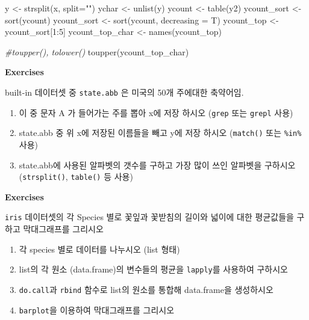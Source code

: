 \documentclass[
]{book}
\newenvironment{Shaded}{\begin{snugshade}}{\end{snugshade}}
\newcommand{\AttributeTok}[1]{\textcolor[rgb]{0.77,0.63,0.00}{#1}}
\newcommand{\CommentTok}[1]{\textcolor[rgb]{0.56,0.35,0.01}{\textit{#1}}}
\newcommand{\DecValTok}[1]{\textcolor[rgb]{0.00,0.00,0.81}{#1}}
\newcommand{\FunctionTok}[1]{\textcolor[rgb]{0.00,0.00,0.00}{#1}}
\newcommand{\NormalTok}[1]{#1}
\newcommand{\OtherTok}[1]{\textcolor[rgb]{0.56,0.35,0.01}{#1}}
\newcommand{\SpecialCharTok}[1]{\textcolor[rgb]{0.00,0.00,0.00}{#1}}
\newcommand{\StringTok}[1]{\textcolor[rgb]{0.31,0.60,0.02}{#1}}
\providecommand{\tightlist}{%
  \setlength{\itemsep}{0pt}\setlength{\parskip}{0pt}}
\begin{document}
\begin{Shaded}
\begin{Highlighting}[]
\NormalTok{y }\OtherTok{\textless{}{-}} \FunctionTok{strsplit}\NormalTok{(x, }\AttributeTok{split=}\StringTok{""}\NormalTok{)}
\NormalTok{ychar }\OtherTok{\textless{}{-}} \FunctionTok{unlist}\NormalTok{(y)}
\NormalTok{ycount }\OtherTok{\textless{}{-}} \FunctionTok{table}\NormalTok{(y2)}
\NormalTok{ycount\_sort }\OtherTok{\textless{}{-}} \FunctionTok{sort}\NormalTok{(ycount)}
\NormalTok{ycount\_sort }\OtherTok{\textless{}{-}} \FunctionTok{sort}\NormalTok{(ycount, }\AttributeTok{decreasing =}\NormalTok{ T)}
\NormalTok{ycount\_top }\OtherTok{\textless{}{-}}\NormalTok{ ycount\_sort[}\DecValTok{1}\SpecialCharTok{:}\DecValTok{5}\NormalTok{]}
\NormalTok{ycount\_top\_char }\OtherTok{\textless{}{-}} \FunctionTok{names}\NormalTok{(ycount\_top)}

\CommentTok{\#toupper(), tolower()}
\FunctionTok{toupper}\NormalTok{(ycount\_top\_char)}
\end{Highlighting}
\end{Shaded}

\textbf{Exercises}

built-in 데이터셋 중 \texttt{state.abb} 은 미국의 50개 주에대한 축약어임.

\begin{enumerate}
\def\labelenumi{\arabic{enumi})}
\item
  이 중 문자 A 가 들어가는 주를 뽑아 x에 저장 하시오 (\texttt{grep} 또는 \texttt{grepl} 사용)
\item
  state.abb 중 위 x에 저장된 이름들을 빼고 y에 저장 하시오 (\texttt{match()} 또는 \texttt{\%in\%}사용)
\item
  state.abb에 사용된 알파벳의 갯수를 구하고 가장 많이 쓰인 알파벳을 구하시오 (\texttt{strsplit()}, \texttt{table()} 등 사용)
\end{enumerate}

\textbf{Exercises}

\texttt{iris} 데이터셋의 각 Species 별로 꽃잎과 꽃받침의 길이와 넓이에 대한 평균값들을 구하고 막대그래프를 그리시오

\begin{enumerate}
\def\labelenumi{\arabic{enumi}.}
\tightlist
\item
  각 species 별로 데이터를 나누시오 (list 형태)
\item
  list의 각 원소 (data.frame)의 변수들의 평균을 \texttt{lapply}를 사용하여 구하시오
\item
  \texttt{do.call}과 \texttt{rbind} 함수로 list의 원소를 통합해 data.frame을 생성하시오
\item
  \texttt{barplot}을 이용하여 막대그래프를 그리시오
\end{enumerate}
\end{document}
